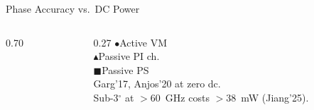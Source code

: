 \documentclass[10pt, aspectratio=169]{beamer}
\begin{document}
\begin{frame}{Phase Accuracy vs.\ DC Power}
\begin{columns}[T]
\begin{column}{0.70\linewidth}
\begin{tikzpicture}
  \end{tikzpicture}
  \end{column}
  \begin{column}{0.27\linewidth}
  \vspace{2ex}
  {\scriptsize
  {\color{uciBlue}$\bullet$}\enspace Active VM\\[0.8ex]
  {\color{uciNavy}$\blacktriangle$}\enspace Passive PI ch.\\[0.8ex]
  {\color{uciAmber}$\blacksquare$}\enspace Passive PS
  }\\[1.5ex]
  {\tiny
    Garg'17, Anjos'20 at zero dc.\\[3pt]
    Sub-3$^\circ$ at $>$60~GHz costs $>\!38$~mW
    (Jiang'25).
  }
  \end{column}
\end{columns}
\end{frame}
\end{document}
